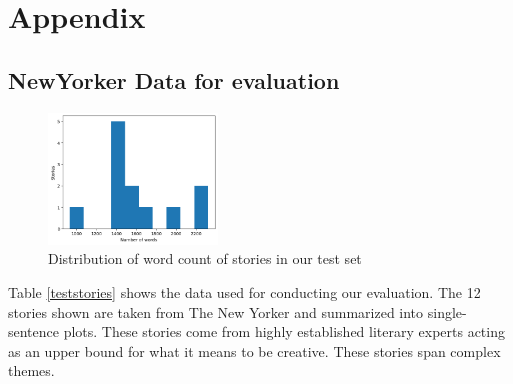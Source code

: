 \section{Appendix} \label{appendix}


\subsection{NewYorker Data for evaluation}

\begin{figure}[!ht]
\small
\centering
\includegraphics[width=0.4\textwidth]{figures/length.png}
\caption{\label{lengthdist} Distribution of word count of stories in our test set}
\end{figure}

Table \ref{teststories} shows the data used for conducting our evaluation. The 12 stories shown are taken from The New Yorker and summarized into single-sentence plots. These stories come from highly established literary experts acting as an upper bound for what it means to be creative. These stories span complex themes.

